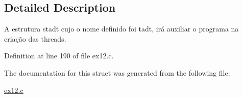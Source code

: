 \subsection{Detailed Description}

\begin{DoxyItemize}
\item A estrutura stadt cujo o nome definido foi tadt, irá auxiliar o programa na criação das threads. 
\end{DoxyItemize}

Definition at line 190 of file ex12.\+c.



The documentation for this struct was generated from the following file\+:\begin{DoxyCompactItemize}
\item 
\hyperlink{ex12_8c}{ex12.\+c}\end{DoxyCompactItemize}

